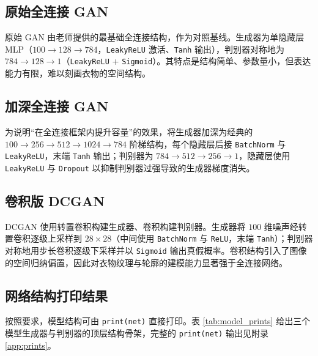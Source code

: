 \documentclass[a4paper]{article}
\begin{document}
\subsection{原始全连接 GAN}
原始 GAN 由老师提供的最基础全连接结构，作为对照基线。生成器为单隐藏层 MLP（$100\rightarrow128\rightarrow784$，\texttt{LeakyReLU} 激活、\texttt{Tanh} 输出），判别器对称地为 $784\rightarrow128\rightarrow1$（\texttt{LeakyReLU} + \texttt{Sigmoid}）。其特点是结构简单、参数量小，但表达能力有限，难以刻画衣物的空间结构。

\subsection{加深全连接 GAN}
为说明“在全连接框架内提升容量”的效果，将生成器加深为经典的 $100\rightarrow256\rightarrow512\rightarrow1024\rightarrow784$ 阶梯结构，每个隐藏层后接 \texttt{BatchNorm} 与 \texttt{LeakyReLU}\cite{ioffe2015batchnorm}，末端 \texttt{Tanh} 输出；判别器为 $784\rightarrow512\rightarrow256\rightarrow1$，隐藏层使用 \texttt{LeakyReLU} 与 \texttt{Dropout} 以抑制判别器过强导致的生成器梯度消失。

\subsection{卷积版 DCGAN}
DCGAN 使用转置卷积构建生成器、卷积构建判别器\cite{radford2015dcgan}。生成器将 $100$ 维噪声经转置卷积逐级上采样到 $28\times28$（中间使用 \texttt{BatchNorm} 与 \texttt{ReLU}，末端 \texttt{Tanh}）；判别器对称地用步长卷积逐级下采样并以 \texttt{Sigmoid} 输出真假概率。卷积结构引入了图像的空间归纳偏置，因此对衣物纹理与轮廓的建模能力显著强于全连接网络。

\subsection{网络结构打印结果}
按照要求，模型结构可由 \texttt{print(net)} 直接打印。表 \ref{tab:model_prints} 给出三个模型生成器与判别器的顶层结构骨架，完整的 \texttt{print(net)} 输出见附录 \ref{app:prints}。
\end{document}
